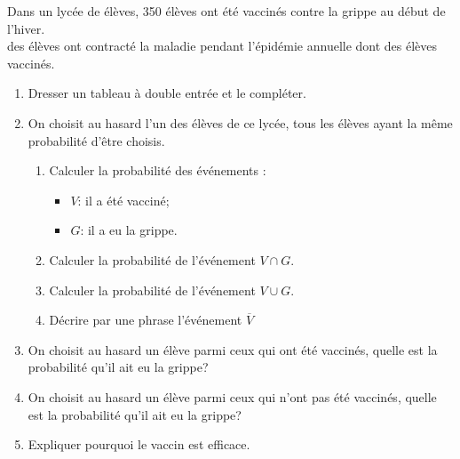 \begin{exercice} Dans un lycée de  élèves, 350 élèves ont été vaccinés contre la 
grippe au début de l'hiver.\\
     des élèves ont contracté la maladie pendant l'épidémie annuelle dont  des élèves vaccinés.
    \begin{enumerate}
        \item Dresser un tableau à double entrée et le compléter.
        \item On choisit au hasard l'un des élèves de ce lycée, tous les élèves 
ayant la même probabilité d'être choisis.
            \begin{enumerate}
                \item Calculer la probabilité des événements :
                \begin{itemize}
                   \item $V$: \og il a été vacciné\fg; 
                    \item $G$: \og il a eu la grippe\fg.
                 \end{itemize}
                \item Calculer la probabilité de l'événement $V\cap G$.
                \item Calculer la probabilité de l'événement $V\cup G$.
                \item Décrire par une phrase l'événement $\overline{V}$
            \end{enumerate}
        \item  On choisit au hasard un élève parmi ceux qui ont été 
vaccinés, quelle est la probabilité qu'il ait eu la grippe?
        			\item On choisit au hasard un élève parmi ceux qui n'ont pas été 
vaccinés, quelle est la probabilité qu'il ait eu la grippe?
        			\item Expliquer pourquoi le vaccin est efficace.
    \end{enumerate}
\end{exercice}



